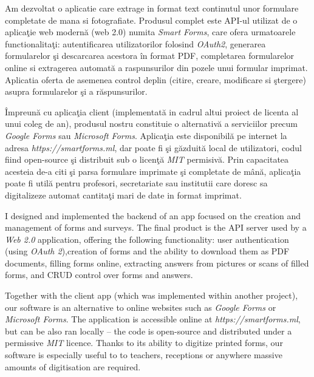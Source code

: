 \documentclass[12pt, a4paper]{report}
\newenvironment{abstractpage}
  {\cleardoublepage\vspace*{\fill}\thispagestyle{empty}}
  {\vfill\cleardoublepage}
\renewenvironment{abstract}[1]
  {\bigskip
  \begin{center}\bfseries\abstractname\end{center}}
  {\par\bigskip}
\begin{document}
\begin{abstractpage}

  \begin{abstract}{}
  Am dezvoltat o aplicatie care extrage in format text continutul unor formulare completate de mana si fotografiate.
  Produsul complet este API-ul utilizat de o aplica\c{t}ie web modern\u{a} (web 2.0) numita \textit{Smart Forms}, care ofera urmatoarele functionalita\c{t}i: autentificarea utilizatorilor folosind \textit{OAuth2}, generarea formularelor \c{s}i descarcarea acestora \^{i}n format PDF, completarea formularelor online si extragerea automat\u{a} a raspunsurilor din pozele unui formular imprimat. Aplicatia oferta de asemenea control deplin (citire, creare, modificare si \c{s}tergere) asupra formularelor \c{s}i a r\u{a}spunsurilor.
  
  \^{I}mpreun\u{a} cu aplica\c{t}ia client (implementat\u{a} in cadrul altui proiect de licenta al unui coleg de an), produsul nostru constituie o alternativ\u a a serviciilor precum \textit{Google Forms} sau \textit{Microsoft Forms}. Aplica\c tia este disponibil\u a pe internet la adresa \textit{https://smartforms.ml}, dar poate fi \c si g\u azduit\u a local de utilizatori, codul fiind open-source \c si distribuit sub o licen\c t\u a \textit{MIT} permisiv\u a. Prin capacitatea acesteia de-a citi \c si parsa formulare imprimate \c si completate de m\^ an\u a, aplica\c tia poate fi util\u a pentru profesori, secretariate sau institutii care doresc sa digitalizeze automat cantita\c ti mari de date in format imprimat. 
  
  \end{abstract}
  
  \begin{abstract}{}
  I designed and implemented the backend of an app focused on the creation and management of forms and surveys. The final product is the API server used by a \textit{Web 2.0} application, offering the following functionality: user authentication (using \textit{OAuth 2}),creation of forms and the ability to download them as PDF documents, filling forms online, extracting answers from pictures or scans of filled forms, and CRUD control over forms and answers.
  
  Together with the client app (which was implemented within another project), our software is an alternative to online websites such as \textit{Google Forms} or \textit{Microsoft Forms}. The application is accessible online at \textit{https://smartforms.ml}, but can be also ran locally -- the code is open-source and distributed under a permissive \textit{MIT} licence. Thanks to its ability to digitize printed forms, our software is especially useful to to teachers, receptions or anywhere massive amounts of digitisation are required.
  \end{abstract}
  
\end{abstractpage}
\end{document}
